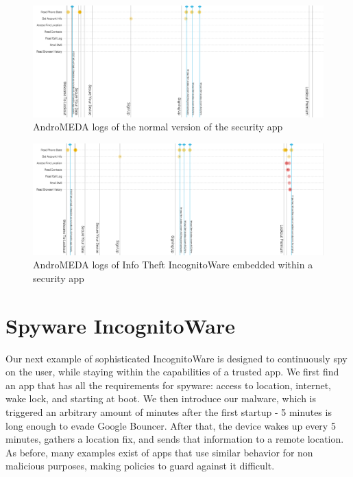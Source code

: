 \begin{figure}[h]
\begin{center}
\includegraphics[width=1.0\columnwidth]{figs/AndroMEDA_Lookout_Notmalware}
\caption{AndroMEDA logs of the normal version of the security app }
\label{fig:infotheft_logs_nonmalware}
\end{center}
\end{figure}

\begin{figure}[h]
\begin{center}
\includegraphics[width=1.0\columnwidth]{figs/AndroMEDA_Lookout_Malware}
\caption{AndroMEDA logs of Info Theft IncognitoWare embedded within a security app }
\label{fig:infotheft_logs_malware}
\end{center}
\end{figure}




\section{Spyware IncognitoWare}
Our next example of sophisticated IncognitoWare is designed to continuously spy on the user, while staying within the capabilities of a trusted app. We first find an app that has all the requirements for spyware: access to location, internet, wake lock, and starting at boot. We then introduce our malware, which is triggered an arbitrary amount of minutes after the first startup - 5 minutes is long enough to evade Google Bouncer\citep{mansfield2012android}. After that, the device wakes up every 5 minutes, gathers a location fix, and sends that information to a remote location. As before, many examples exist of apps that use similar behavior for non malicious purposes, making policies to guard against it difficult.


